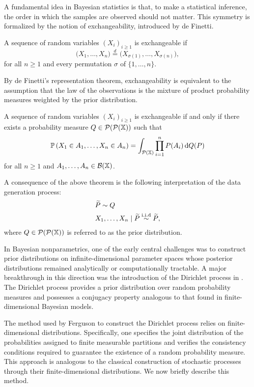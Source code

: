 A fundamental idea in Bayesian statistics is that, to make a statistical inference, the order in which the samples are observed should not matter. This symmetry is formalized by the notion of exchangeability, introduced by de Finetti.
\begin{definition}\label{definition:exchangeability}
A sequence of random variables $(X_i)_{i \geq 1}$ is exchangeable if
\[
\big(X_1,\dots, X_n\big) \overset{d}{=} \big(X_{\sigma(1)},\dots, X_{\sigma(n)}\big),
\]
for all $n \geq 1$ and every permutation $\sigma$ of $\{1,\dots,n\}$.
\end{definition}
By de Finetti's representation theorem, exchangeability is equivalent to the assumption that the law of the observations is the mixture of product probability measures weighted by the prior distribution. 
\begin{theorem}\label{theorem:definetti}
A sequence of random variables $(X_i)_{i \geq 1}$ is exchangeable if and only if there exists a probability measure $Q \in \mathcal{P}(\mathcal{P}(\mathbb{X}))$ such that
\[
\mathbb{P}\left(X_1\in A_1,\dots, X_n\in A_n\right) = \int_{\mathcal{P}(\mathbb{X})}\prod_{i = 1}^n P(A_i)\, \mathrm{d}Q(P)
\]
for all $n \geq 1$ and $A_1,\dots,A_n \in \mathcal{B}(\mathbb{X})$.
\end{theorem}
A consequence of the above theorem is the following interpretation of the data generation process:
\begin{align*}
    &\widetilde{P} \sim Q \\
    &X_1,\dots, X_n \mid \widetilde{P}\overset{\mathrm{i.i.d}}{\sim} \widetilde{P},
\end{align*}
where $Q \in \mathcal{P}(\mathcal{P}(\mathbb{X}))$ is referred to as the prior distribution.

In Bayesian nonparametrics, one of the early central challenges was to construct prior distributions on infinite-dimensional parameter spaces whose posterior distributions remained analytically or computationally tractable. A major breakthrough in this direction was the introduction of the Dirichlet process in \cite{ferguson1973bayesian}. The Dirichlet process provides a prior distribution over random probability measures and possesses a conjugacy property analogous to that found in finite-dimensional Bayesian models.

The method used by Ferguson to construct the Dirichlet process relies on finite-dimensional distributions. Specifically, one specifies the joint distribution of the probabilities assigned to finite measurable partitions and verifies the consistency conditions required to guarantee the existence of a random probability measure. This approach is analogous to the classical construction of stochastic processes through their finite-dimensional distributions. We now briefly describe this method.

